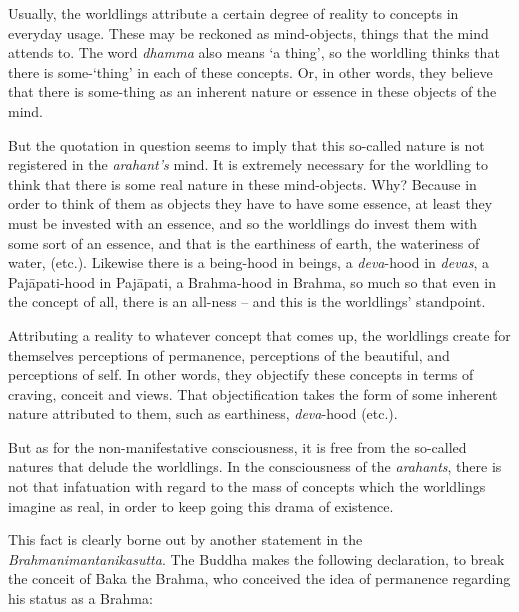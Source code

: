 Usually, the worldlings attribute a certain degree of reality to concepts in everyday usage. These may be reckoned as mind-objects, things that the mind attends to. The word \emph{dhamma} also means `a thing', so the worldling thinks that there is some-`thing' in each of these concepts. Or, in other words, they believe that there is some-thing as an inherent nature or essence in these objects of the mind.

But the quotation in question seems to imply that this so-called nature is not registered in the \emph{arahant's} mind. It is extremely necessary for the worldling to think that there is some real nature in these mind-objects. Why? Because in order to think of them as objects they have to have some essence, at least they must be invested with an essence, and so the worldlings do invest them with some sort of an essence, and that is the earthiness of earth, the wateriness of water, (etc.). Likewise there is a being-hood in beings, a \emph{deva}-hood in \emph{devas}, a Pajāpati-hood in Pajāpati, a Brahma-hood in Brahma, so much so that even in the concept of all, there is an all-ness -- and this is the worldlings' standpoint.

Attributing a reality to whatever concept that comes up, the worldlings create for themselves perceptions of permanence, perceptions of the beautiful, and perceptions of self. In other words, they objectify these concepts in terms of craving, conceit and views. That objectification takes the form of some inherent nature attributed to them, such as earthiness, \emph{deva}-hood (etc.).

But as for the non-manifestative consciousness, it is free from the so-called natures that delude the worldlings. In the consciousness of the \emph{arahants}, there is not that infatuation with regard to the mass of concepts which the worldlings imagine as real, in order to keep going this drama of existence.

This fact is clearly borne out by another statement in the \emph{Brahmanimantanikasutta}. The Buddha makes the following declaration, to break the conceit of Baka the Brahma, who conceived the idea of permanence regarding his status as a Brahma:

